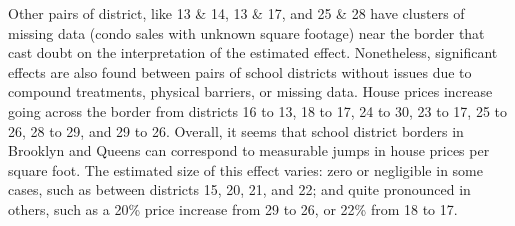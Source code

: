 	Other pairs of district, like 13 \& 14, 13 \& 17, and 25 \& 28 have clusters of missing data (condo sales with unknown square footage) near the border that cast doubt on the interpretation of the estimated effect.
Nonetheless, significant effects are also found between pairs of school districts without issues due to compound treatments, physical barriers, or missing data.
House prices increase going across the border from districts 16 to 13, 18 to 17, 24 to 30, 23 to 17, 25 to 26, 28 to 29, and 29 to 26.
Overall, it seems that school district borders in Brooklyn and Queens can correspond to measurable jumps in house prices per square foot.
The estimated size of this effect varies: zero or negligible in some cases, such as between districts 15, 20, 21, and 22; and quite pronounced in others, such as a 20\% price increase from 29 to 26, or 22\% from 18 to 17.

